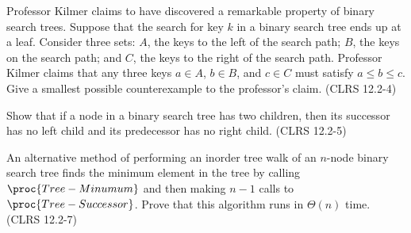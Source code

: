 \documentclass{article}
\begin{document}
\begin{Exercise}[title={Fun creative exercises!}]
    \Question
    Professor Kilmer claims to have discovered a remarkable property of binary
    search trees.  Suppose that the search for key $k$ in a binary search tree
    ends up at a leaf.  Consider three sets: $A$, the keys to the left of the
    search path; $B$, the keys on the search path; and $C$, the keys to the
    right of the search path. Professor Kilmer claims that any three keys $a \in
    A$, $b \in B$, and $c \in  C$ must satisfy $a \leq b \leq c$. Give a
    smallest possible counterexample to the professor's claim. (CLRS 12.2-4)

    \Question
    Show that if a node in a binary search tree has two children, then its
    successor has no left child and its predecessor has no right child. (CLRS
    12.2-5)

    \Question
    An alternative method of performing an inorder tree walk of an $n$-node
    binary search tree finds the minimum element in the tree by calling
    $\proc{Tree-Minumum}$ and then making $n - 1$ calls to
    $\proc{Tree-Successor}$. Prove that this algorithm runs in $\Theta(n)$ time.
    (CLRS 12.2-7)

\end{Exercise}
\end{document}
